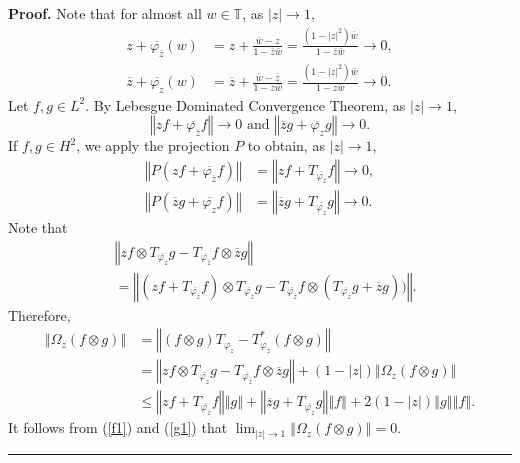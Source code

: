 \documentclass{article}%
\newenvironment{proof}[1][Proof]{\noindent\textbf{#1.} }{\ \rule{0.5em}{0.5em}}
\begin{document}
\begin{proof}
Note that for almost all $w\in\mathbb{T}$, as $|z|\rightarrow1,$
\begin{align*}
z+\overline{{\varphi}_{\overline{z}}}(w)  &  =z+\frac{\bar{w}-z}{1-\bar{z}%
\bar{w}}=\frac{(1-|z|^{2})\bar{w}}{1-\bar{z}\bar{w}}\rightarrow0,\\
\overline{z}+\overline{{\varphi}_{z}}(w)  &  =\overline{z}+\frac{\bar
{w}-\overline{z}}{1-z\bar{w}}=\frac{(1-|z|^{2})\bar{w}}{1-z\bar{w}}%
\rightarrow0.
\end{align*}
Let $f,g\in L^{2}.$ By Lebesgue Dominated Convergence Theorem, as
$|z|\rightarrow1$,%
\[
\left\Vert zf+\overline{{\varphi}_{\overline{z}}}f\right\Vert \rightarrow
0\text{ and }\left\Vert \overline{z}g+\overline{\varphi_{z}}g\right\Vert
\rightarrow0.
\]
If $f,g\in H^{2}$, we apply the projection $P$ to obtain, as $|z|\rightarrow
1$,%
\begin{align}
\left\Vert P\left(  zf+\overline{{\varphi}_{\overline{z}}}f\right)
\right\Vert  &  =\left\Vert zf+T_{\overline{{\varphi}_{\overline{z}}}%
}f\right\Vert \rightarrow0,\label{f1}\\
\left\Vert P\left(  \overline{z}g+\overline{\varphi_{z}}f\right)  \right\Vert
&  =\left\Vert \overline{z}g+T_{\overline{\varphi_{z}}}g\right\Vert
\rightarrow0. \label{g1}%
\end{align}
Note that
\begin{align*}
&  \left\Vert zf\otimes T_{\overline{\varphi_{z}}}g-T_{\overline{{\varphi
}_{\overline{z}}}}f\otimes\overline{z}g\right\Vert \\
&  =\left\Vert \left(  zf+T_{\overline{{\varphi}_{\overline{z}}}}f\right)
\otimes T_{\overline{\varphi_{z}}}g-T_{\overline{{\varphi}_{\overline{z}}}%
}f\otimes\left(  T_{\overline{\varphi_{z}}}g+\overline{z}g\right)
)\right\Vert .
\end{align*}
Therefore,%
\begin{align*}
\left\Vert \Omega_{z}(f\otimes g)\right\Vert  &  =\left\Vert (f\otimes
g)T_{\varphi_{z}}-T_{\varphi_{\overline{z}}}^{\ast}(f\otimes g)\right\Vert \\
&  =\left\Vert zf\otimes T_{\overline{\varphi_{z}}}g-T_{\overline{{\varphi
}_{\overline{z}}}}f\otimes\overline{z}g\right\Vert +(1-\left\vert z\right\vert
)\left\Vert \Omega_{z}(f\otimes g)\right\Vert \\
&  \leq\left\Vert zf+T_{\overline{{\varphi}_{\overline{z}}}}f\right\Vert
\left\Vert g\right\Vert +\left\Vert \overline{z}g+T_{\overline{\varphi_{z}}%
}g\right\Vert \left\Vert f\right\Vert +2(1-\left\vert z\right\vert )\left\Vert
g\right\Vert \left\Vert f\right\Vert .
\end{align*}
It follows from (\ref{f1}) and (\ref{g1}) that $\lim_{\left\vert z\right\vert
\rightarrow1}\left\Vert \Omega_{z}(f\otimes g)\right\Vert =0.$
\end{proof}
\end{document}
